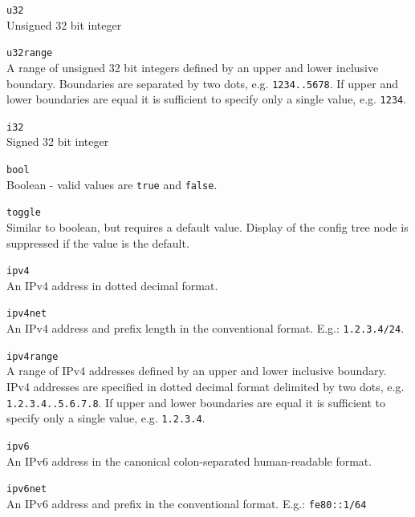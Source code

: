 \documentclass[11pt]{article}
\begin{document}
\begin{description}

  \item{\tt u32}\\
  Unsigned 32 bit integer

  \item{\tt u32range}\\
  A range of unsigned 32 bit integers defined by an upper and lower
  inclusive boundary.  Boundaries are separated by two dots,
  e.g. {\tt 1234..5678}.  If upper and lower boundaries are equal it is
  sufficient to specify only a single value, e.g. {\tt 1234}.

  \item{\tt i32}\\
  Signed 32 bit integer

  \item{\tt bool}\\
  Boolean - valid values are {\tt true} and {\tt false}.

  \item{\tt toggle}\\
  Similar to boolean, but requires a default value.  Display of the
  config tree node is suppressed if the value is the default.

  \item{\tt ipv4}\\
  An IPv4 address in dotted decimal format.

  \item{\tt ipv4net}\\
  An IPv4 address and prefix length in the
  conventional format.  E.g.: {\tt 1.2.3.4/24}.

  \item{\tt ipv4range}\\
  A range of IPv4 addresses defined by an upper and lower inclusive boundary.
  IPv4 addresses are specified in dotted decimal format delimited by two dots,
  e.g. {\tt 1.2.3.4..5.6.7.8}. If upper and lower boundaries are equal it is
  sufficient to specify only a single value, e.g. {\tt 1.2.3.4}.

  \item{\tt ipv6}\\
  An IPv6 address in the canonical colon-separated human-readable format.

  \item{\tt ipv6net}\\
  An IPv6 address and prefix in the conventional format.
  E.g.: {\tt fe80::1/64}


\end{description}
\end{document}
